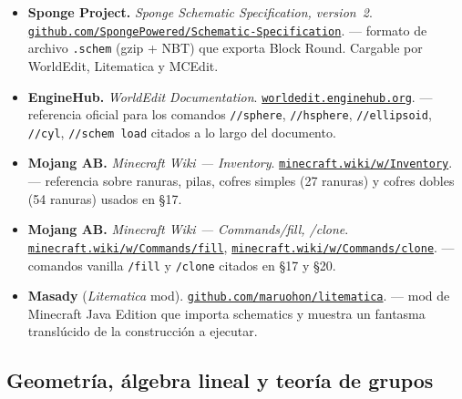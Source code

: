 \documentclass[12pt,a4paper]{scrartcl}
\newcommand{\code}[1]{\texttt{\small #1}}
\newcommand{\cmd}[1]{\textcolor{earth}{\texttt{\small #1}}}
\newcommand{\biblink}[2]{\href{#1}{\nolinkurl{#2}}}
\begin{document}
\begin{itemize}[leftmargin=1.4em,itemsep=0.3em,topsep=0.3em]
  \item \textbf{Sponge Project.} \emph{Sponge Schematic Specification, version~2}.
        \biblink{https://github.com/SpongePowered/Schematic-Specification}{github.com/SpongePowered/Schematic-Specification}.
        --- formato de archivo \code{.schem} (gzip + NBT) que exporta Block Round. Cargable por WorldEdit, Litematica y MCEdit.

  \item \textbf{EngineHub.} \emph{WorldEdit Documentation}.
        \biblink{https://worldedit.enginehub.org/}{worldedit.enginehub.org}.
        --- referencia oficial para los comandos \cmd{//sphere}, \cmd{//hsphere}, \cmd{//ellipsoid}, \cmd{//cyl}, \cmd{//schem load} citados a lo largo del documento.

  \item \textbf{Mojang AB.} \emph{Minecraft Wiki --- Inventory}.
        \biblink{https://minecraft.wiki/w/Inventory}{minecraft.wiki/w/Inventory}.
        --- referencia sobre ranuras, pilas, cofres simples (27 ranuras) y cofres dobles (54 ranuras) usados en §17.

  \item \textbf{Mojang AB.} \emph{Minecraft Wiki --- Commands/fill, /clone}.
        \biblink{https://minecraft.wiki/w/Commands/fill}{minecraft.wiki/w/Commands/fill},
        \biblink{https://minecraft.wiki/w/Commands/clone}{minecraft.wiki/w/Commands/clone}.
        --- comandos vanilla \cmd{/fill} y \cmd{/clone} citados en §17 y §20.

  \item \textbf{Masady} (\emph{Litematica} mod).
        \biblink{https://github.com/maruohon/litematica}{github.com/maruohon/litematica}.
        --- mod de Minecraft Java Edition que importa schematics y muestra un fantasma translúcido de la construcción a ejecutar.
\end{itemize}

\subsection*{Geometría, álgebra lineal y teoría de grupos}
\end{document}
